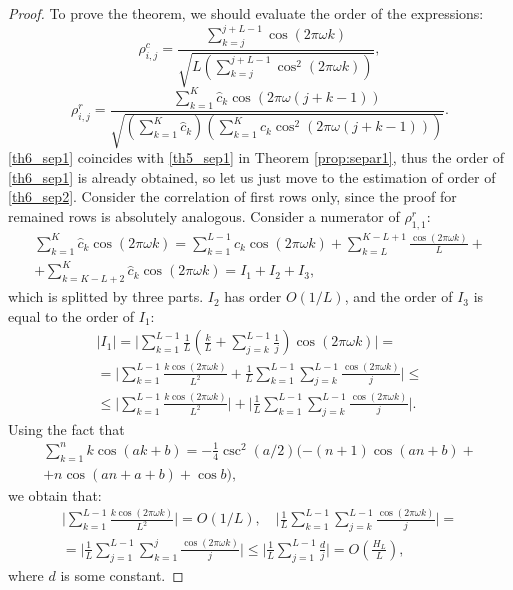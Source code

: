 \documentclass[sii]{ipart}
\begin{document}
\begin{proof}
	To prove the theorem, we should evaluate the order of the expressions:
	\begin{equation}\label{th6_sep1}
	\rho^c_{i,j} = \frac{\sum_{k=j}^{j + L - 1} \cos(2 \pi \omega k)}{\sqrt{L (\sum_{k=j}^{j + L - 1} \cos^2(2 \pi \omega k))}},
	\end{equation}
	\begin{equation}\label{th6_sep2}
	\rho^r_{i,j} = \frac{\sum_{k=1}^K \hat c_k\cos(2 \pi \omega (j + k - 1))}{\sqrt{(\sum_{k=1}^K \hat c_k) (\sum_{k=1}^K \hat c_k\cos^2(2 \pi \omega (j + k - 1)))}}.
	\end{equation}
\eqref{th6_sep1} coincides with \eqref{th5_sep1} in Theorem \ref{prop:separ1}, 
thus the order of \eqref{th6_sep1} is already obtained, so let us just move to the estimation of order of \eqref{th6_sep2}. Consider the correlation of first rows only, since the proof for remained rows is absolutely analogous. Consider a numerator of $\rho^r_{1,1}$:
	\begin{gather*}
	\sum_{k=1}^K \hat c_k\cos(2 \pi \omega k) = \sum_{k=1}^{L-1} \hat c_k\cos(2 \pi \omega k) + \sum_{k=L}^{K - L + 1} \frac{\cos(2 \pi \omega k)}{L} +\\+ \sum_{k=K - L + 2}^{K} \hat c_k\cos(2 \pi \omega k) = I_1 + I_2 + I_3,
	\end{gather*}
	which is splitted by three parts. $I_2$ has order $O(1/L)$, and the order of $I_3$ is equal to the order of $I_1$:
	\begin{multline*}
	|I_1|=\bigg|\sum_{k=1}^{L-1}\frac{1}{L}\left(\frac{k}{L} + \sum_{j=k}^{L-1} \frac{1}{j} \right) \cos(2 \pi \omega k)\bigg| =\\= \bigg|\sum_{k=1}^{L-1} \frac{k \cos(2 \pi \omega k)}{L^2} +  \frac{1}{L}\sum_{k = 1}^{L-1}\sum_{j = k}^{L-1}\frac{\cos(2 \pi \omega k)}{j}\bigg| \le \\ \le
	\bigg|\sum_{k=1}^{L-1} \frac{k \cos(2 \pi \omega k)}{L^2}\bigg| + \bigg|\frac{1}{L}\sum_{k = 1}^{L-1}\sum_{j = k}^{L-1}\frac{\cos(2 \pi \omega k)}{j}\bigg|.
	\end{multline*}
	Using the fact that
	\begin{multline*}
	\sum_{k=1}^n k \cos(ak + b) = -\frac{1}{4}\csc^2(a/2)(-(n+1)\cos(an+b) + \\ + n\cos(an + a + b) + \cos b),
	\end{multline*}
	we obtain that:
	\begin{multline*}
	\bigg|\sum_{k=1}^{L-1} \frac{k \cos(2 \pi \omega k)}{L^2}\bigg| = O(1/L), \quad
	\bigg|\frac{1}{L}\sum_{k = 1}^{L-1}\sum_{j = k}^{L-1}\frac{\cos(2 \pi \omega k)}{j}\bigg| = \\ =\bigg|\frac{1}{L}\sum_{j = 1}^{L-1}\sum_{k = 1}^{j}\frac{\cos(2 \pi \omega k)}{j}\bigg| \le \bigg|\frac{1}{L}\sum_{j = 1}^{L-1}\frac{d}{j}\bigg| = O \left(\frac{H_L}{L} \right),
	\end{multline*}
	where $d$ is some constant.
	

\end{proof}
\end{document}
